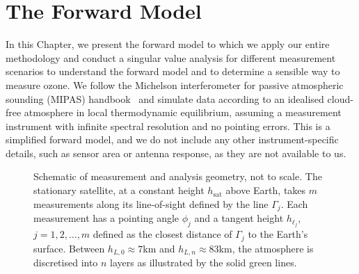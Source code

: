 \chapter{The Forward Model}
\label{ch:formodel}
\thispagestyle{empty}

In this Chapter, we present the forward model to which we apply our entire methodology and conduct a singular value analysis for different measurement scenarios to understand the forward model and to determine a sensible way to measure ozone. We follow the Michelson interferometer for passive atmospheric sounding (MIPAS) handbook~\cite{mipas2000handbook} and simulate data according to an idealised cloud-free atmosphere in local thermodynamic equilibrium, assuming a measurement instrument with infinite spectral resolution and no pointing errors.
This is a simplified forward model, and we do not include any other instrument-specific details, such as sensor area or antenna response, as they are not available to us. 
\begin{figure}[ht!]
	\centering
	
	\caption[Schematic of measurement and analysis geometry.]{Schematic of measurement and analysis geometry, not to scale.
		The stationary satellite, at a constant height $h_\text{sat}$ above Earth, takes $m$ measurements along its line-of-sight defined by the line $\Gamma_j$.
		Each measurement has a pointing angle $\phi_j$ and a tangent height $h_{\ell_j}$, $j=1,2,\dots,m$ defined as the closest distance of $\Gamma_j$ to the Earth's surface.
		Between $h_{L,0} \approx 7$km and $h_{L,n} \approx 83$km, the atmosphere is discretised into $n$ layers as illustrated by the solid green lines.}
	\label{fig:LIMB}
\end{figure}

